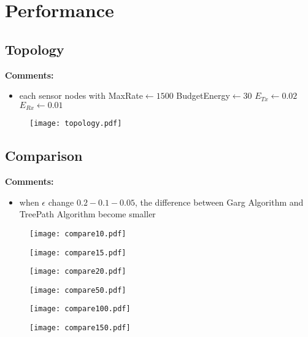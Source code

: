 \section{Performance}
\subsection{Topology}
\textbf{Comments:}
\begin{itemize}
\item each sensor nodes with MaxRate$\leftarrow 1500$ BudgetEnergy$\leftarrow 30$ $E_{Tx}\leftarrow 0.02$ $E_{Rx}\leftarrow 0.01$
\end{itemize}
\begin{figure}[h]
\centering
\texttt{[image: topology.pdf]}
\end{figure}

\subsection{Comparison}
\textbf{Comments:}
\begin{itemize}
\item when $\epsilon$ change $0.2-0.1-0.05$, the difference between Garg Algorithm and TreePath Algorithm become smaller
\end{itemize}
\begin{figure}[h]
\centering
\texttt{[image: compare10.pdf]}
\end{figure}
\begin{figure}[h]
\centering
\texttt{[image: compare15.pdf]}
\end{figure}
\begin{figure}[h]
\centering
\texttt{[image: compare20.pdf]}
\end{figure}
\begin{figure}[h]
\centering
\texttt{[image: compare50.pdf]}
\end{figure}
\begin{figure}[h]
\centering
\texttt{[image: compare100.pdf]}
\end{figure}
\begin{figure}[h]
\centering
\texttt{[image: compare150.pdf]}
\end{figure}